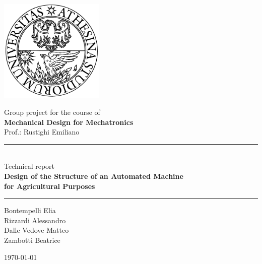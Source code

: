\documentclass[11pt,a4paper]{article}
\begin{document}
	
	\thispagestyle{empty}
	\begin{center}
		\includegraphics[width=5cm]{logouni}
		\vspace{2cm}
		
		{\Large Group project for the course of \\ \vspace{3mm}
		\textbf{Mechanical Design for Mechatronics} \\ \vspace{1cm}
		Prof.: Rustighi Emiliano} \vspace{1cm}
	
		\rule{5cm}{0.5pt} \\ \vspace{1cm}
		{\Large Technical report} \\ \vspace{3mm}
		{\LARGE \textbf{Design of the Structure of an Automated Machine \\ for Agricultural Purposes}} \\ \vspace{1cm}
		
		\rule{5cm}{0.5pt} \vspace{1cm}
		
		\begin{multicols}{2}
			Bontempelli Elia \\
			Rizzardi Alessandro \\
			Dalle Vedove Matteo \\
			Zambotti Beatrice
		\end{multicols}
		\vspace{1cm}
		
		\today
		
	\end{center}
	
	\newpage
	\tableofcontents
	
	\newpage
	
	\setcounter{page}{1}
	
	
	
	
	
	
\end{document}
